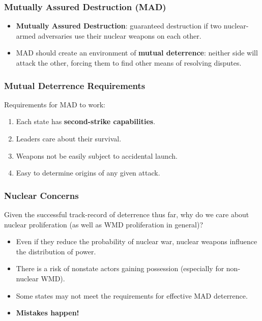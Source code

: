 \documentclass{beamer}
\begin{document}
\begin{frame} 
	\frametitle{\LARGE{Mutually Assured Destruction (MAD)}}
	\begin{itemize}
	\item \textbf{Mutually Assured Destruction}: guaranteed destruction if two nuclear-armed adversaries use their nuclear weapons on each other. \pause
	\item MAD should create an environment of \textbf{mutual deterrence}: neither side will attack the other, forcing them to find other means of resolving disputes.
	\end{itemize}
\end{frame}

\begin{frame} 
\frametitle{\LARGE{Mutual Deterrence Requirements}}
Requirements for MAD to work: \pause
\begin{enumerate}
		\item Each state has \textbf{second-strike capabilities}. \pause
		\item Leaders care about their survival. \pause
		\item Weapons not be easily subject to accidental launch. \pause
		\item Easy to determine origins of any given attack.
\end{enumerate}
\end{frame}

\begin{frame} 
\frametitle{\LARGE{Nuclear Concerns}}
Given the successful track-record of deterrence thus far, why do we care about nuclear proliferation (as well as WMD proliferation in general)? \pause
	\begin{itemize}
		\item Even if they reduce the probability of nuclear war, nuclear weapons influence the distribution of power. \pause
		\item There is a risk of nonstate actors gaining possession (especially for non-nuclear WMD). \pause 
        \item Some states may not meet the requirements for effective MAD deterrence. \pause 		
        \item \textbf{Mistakes happen!}
\end{itemize}
\end{frame}
\end{document}
